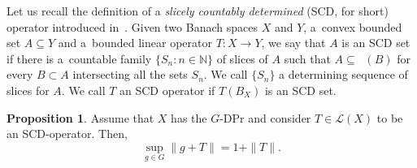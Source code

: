 \documentclass[a4paper,12pt]{amsart}
\theoremstyle{definition}
\newtheorem{proposition}[theorem]{Proposition}
\theoremstyle{definition}
\theoremstyle{remark}
\numberwithin{equation}{section}
\newcommand{\N}{\mathbb{N}}
\newcommand{\clco}{\mathop{\overline{\mathrm{co}}}\nolimits}
\newcommand{\<}{\langle}
\renewcommand{\>}{\rangle}
\begin{document}
	Let us recall the definition of a \emph{slicely countably determined} (SCD, for short) operator introduced in~\cite{AKMMS}.
	Given two Banach spaces $X$ and $Y$, a~convex bounded set $A \subseteq Y$ and a~bounded linear operator $T: X \to Y$, we say that $A$ is an SCD set if there is a~countable family $\{S_n : n \in \N\}$ of slices of $A$ such that $A \subseteq \clco(B)$ for every $B \subset A$ intersecting all the sets $S_n$. We call $\{S_n\}$ a determining sequence of slices for $A$. We call $T$ an SCD operator if $T(B_X)$ is an SCD set.
	
	\begin{proposition} \label{prop:G-DPandSCDoperators}
		Assume that $X$ has the $G$-DPr and consider $T \in \mathcal{L}(X)$ to be an SCD-operator. Then,
		\begin{equation*}
			\sup_{g \in G} \|g + T\| = 1 + \|T\|.
		\end{equation*}
	\end{proposition}
	
\end{document}
